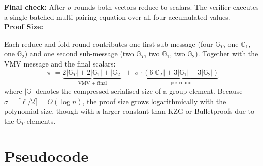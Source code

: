 \textbf{Final check:} After $\sigma$ rounds both vectors reduce to scalars.
The verifier executes a single batched multi-pairing equation over all four
accumulated values.
\\
\textbf{Proof Size:}

Each reduce-and-fold round contributes one first sub-message
(four $\mathbb{G}_T$, one $\mathbb{G}_1$, one $\mathbb{G}_2$) and one second
sub-message (two $\mathbb{G}_T$, two $\mathbb{G}_1$, two $\mathbb{G}_2$).
Together with the VMV message and the final scalars:
\begin{equation}
    |\pi| =
    \underbrace{2|\mathbb{G}_T| + 2|\mathbb{G}_1| + |\mathbb{G}_2|}_{\text{VMV + final}}
    \;+\;
    \sigma \cdot
    \underbrace{(6|\mathbb{G}_T| + 3|\mathbb{G}_1| + 3|\mathbb{G}_2|)}_{\text{per round}}
\end{equation}
where $|\mathbb{G}|$ denotes the compressed serialised size of a group
element. Because $\sigma = \lceil\ell/2\rceil = O(\log n)$, the proof size
grows logarithmically with the polynomial size, though with a larger constant
than KZG or Bulletproofs due to the $\mathbb{G}_T$ elements.

\section{Pseudocode}

